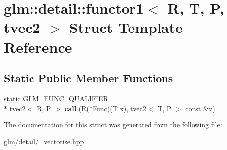 \hypertarget{structglm_1_1detail_1_1functor1_3_01R_00_01T_00_01P_00_01tvec2_01_4}{\section{glm\-:\-:detail\-:\-:functor1$<$ R, T, P, tvec2 $>$ Struct Template Reference}
\label{structglm_1_1detail_1_1functor1_3_01R_00_01T_00_01P_00_01tvec2_01_4}
}
\subsection*{Static Public Member Functions}
\begin{DoxyCompactItemize}
\item 
\hypertarget{structglm_1_1detail_1_1functor1_3_01R_00_01T_00_01P_00_01tvec2_01_4_aaabd54c114db7c12681014fcbcf763bf}{static G\-L\-M\-\_\-\-F\-U\-N\-C\-\_\-\-Q\-U\-A\-L\-I\-F\-I\-E\-R \\*
\hyperlink{structglm_1_1tvec2}{tvec2}$<$ R, P $>$ {\bfseries call} (R($\ast$Func)(T x), \hyperlink{structglm_1_1tvec2}{tvec2}$<$ T, P $>$ const \&v)}\label{structglm_1_1detail_1_1functor1_3_01R_00_01T_00_01P_00_01tvec2_01_4_aaabd54c114db7c12681014fcbcf763bf}

\end{DoxyCompactItemize}


The documentation for this struct was generated from the following file\-:\begin{DoxyCompactItemize}
\item 
glm/detail/\hyperlink{__vectorize_8hpp}{\-\_\-vectorize.\-hpp}\end{DoxyCompactItemize}
